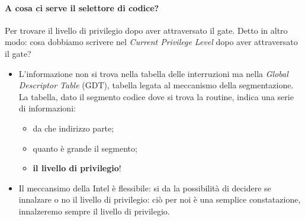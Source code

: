 \paragraph{A cosa ci serve il selettore di codice?} Per trovare il livello di privilegio dopo aver attraversato il gate. Detto in altro modo: cosa dobbiamo scrivere nel \emph{Current Privilege Level} dopo aver attraversato il gate?
\begin{itemize}
	\item  L'informazione non si trova nella tabella delle interruzioni ma nella \emph{Global Descriptor Table} (GDT), tabella legata al meccanismo della segmentazione. La tabella, dato il segmento codice dove si trova la routine, indica una serie di informazioni:
	\begin{itemize}
		\item da che indirizzo parte;
		\item quanto è grande il segmento;
		\item \textbf{il livello di privilegio}!
	\end{itemize} 
	\item Il meccansimo della Intel è flessibile: si da la possibilità di decidere se innalzare o no il livello di privilegio: ciò per noi è una semplice constatazione, innalzeremo sempre il livello di privilegio.
\end{itemize} 
\clearpage
